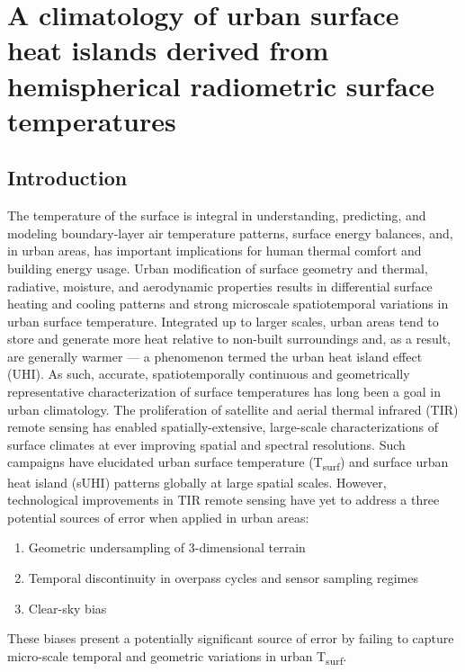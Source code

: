 \chapter{A climatology of urban surface heat islands derived from hemispherical radiometric surface temperatures}

\section{Introduction}

The temperature of the surface is integral in understanding, predicting, and modeling boundary-layer air temperature patterns, surface energy balances, and, in urban areas, has important implications for human thermal comfort and building energy usage. Urban modification of surface geometry and thermal, radiative, moisture, and aerodynamic properties results in differential surface heating and cooling patterns and strong microscale spatiotemporal variations in urban surface temperature. Integrated up to larger scales, urban areas tend to store and generate more heat relative to non-built surroundings and, as a result, are generally warmer --- a phenomenon termed the urban heat island effect (UHI). As such, accurate, spatiotemporally continuous and geometrically representative characterization of surface temperatures has long been a goal in urban climatology. The proliferation of satellite and aerial thermal infrared (TIR) remote sensing has enabled spatially-extensive, large-scale characterizations of surface climates at ever improving spatial and spectral resolutions. Such campaigns have elucidated urban surface temperature (T\textsubscript{surf}) and surface urban heat island (sUHI) patterns globally at large spatial scales. However, technological improvements in TIR remote sensing have yet to address a three potential sources of error when applied in urban areas: 

\begin{enumerate}
	\item Geometric undersampling of 3-dimensional terrain
	\item Temporal discontinuity in overpass cycles and sensor sampling regimes
	\item Clear-sky bias
\end{enumerate}

These biases present a potentially significant source of error by failing to capture micro-scale temporal and geometric variations in urban T\textsubscript{surf}. 

